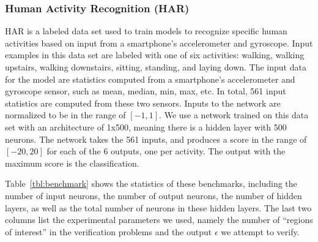 \subsubsection{Human Activity Recognition (HAR)~\cite{AnguitaHAR}}
HAR is a labeled data set used to train models to recognize specific
human activities based on input from a smartphone's accelerometer and gyroscope.
Input examples in this data set are labeled with one of six activities:
walking, walking upstairs, walking downstairs, sitting,
standing, and laying down. The input data for the model are statistics computed from a smartphone's accelerometer and gyroscope sensor,
such as mean, median, min, max, etc. In total, 561 input statistics are computed from these two
sensors. Inputs to the network are normalized to be in the range of $[-1, 1]$.
We use a network trained on this data set with an architecture of
1x500, meaning there is a hidden layer with 500 neurons. The network
takes the 561 inputs, and produces a score in the range
of $[-20, 20]$ for each of the 6 outputs, one per
activity.  The output with the maximum score is the classification.


Table~\ref{tbl:benchmark} shows the statistics of these benchmarks, including the number
of input neurons, the number of output neurons, the number of hidden
layers, as well as the total number of neurons in these hidden layers. The last two columns list the experimental parameters we used, namely the number of ``regions of interest'' in the verification problems and the output $ \epsilon $ we attempt to verify.


